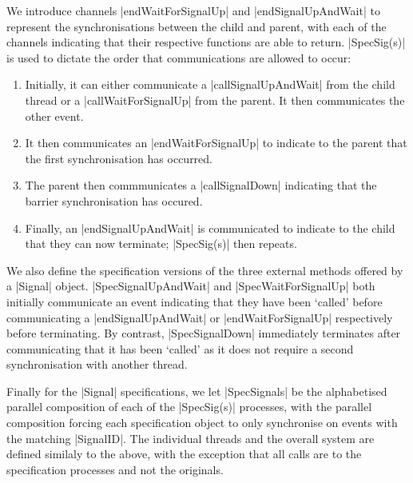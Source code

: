 We introduce channels |endWaitForSignalUp| and |endSignalUpAndWait| to represent the synchronisations between the child and parent, with each of the channels indicating that their respective functions are able to return. |SpecSig(s)| is used to dictate the order that communications are allowed to occur:

\begin{enumerate}
  \item Initially, it can either communicate a |callSignalUpAndWait| from the child thread or a |callWaitForSignalUp| from the parent. It then communicates the other event.
  \item It then communicates an |endWaitForSignalUp| to indicate to the parent that the first synchronisation has occurred.
  \item The parent then commmunicates a |callSignalDown| indicating that the barrier synchronisation has occured.
  \item Finally, an |endSignalUpAndWait| is communicated to indicate to the child that they can now terminate; |SpecSig(s)| then repeats.
\end{enumerate}

We also define the specification versions of the three external methods offered by a |Signal| object. |SpecSignalUpAndWait| and |SpecWaitForSignalUp| both initially communicate an event indicating that they have been `called' before communicating a |endSignalUpAndWait| or |endWaitForSignalUp| respectively before terminating. By contrast, |SpecSignalDown| immediately terminates after communicating that it has been `called' as it does not require a second synchronisation with another thread.

Finally for the |Signal| specifications, we let |SpecSignals| be the alphabetised parallel composition of each of the |SpecSig(s)| processes, with the parallel composition forcing each specification object to only synchronise on events with the matching |SignalID|. The individual threads and the overall system are defined similaly to the above, with the exception that all calls are to the specification processes and not the originals.


